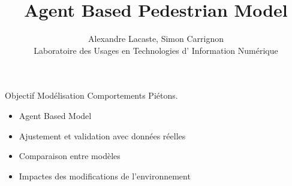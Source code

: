 \documentclass[hyperref={pdfpagelabel=false},8pt, handout=show,show notes]{beamer}
\author[]{Alexandre Lacaste, Simon Carrignon\\ 
 Laboratoire des Usages en Technologies d' Information Numérique
}
\title{Agent Based Pedestrian Model}
\begin{document}
\begin{frame}
 \maketitle
\end{frame}

\begin{frame}
 \begin{beamerboxesrounded}{Objectif}
  Mod\'elisation Comportements Pi\'etons.
  \begin{itemize}
   \item Agent Based Model
   \item Ajustement et validation avec donn\'ees r\'eelles 
   \item Comparaison entre mod\`eles
   \item Impactes des modifications de l'environnement
 \end{itemize}


 \end{beamerboxesrounded}
 
\end{frame}
\end{document}

